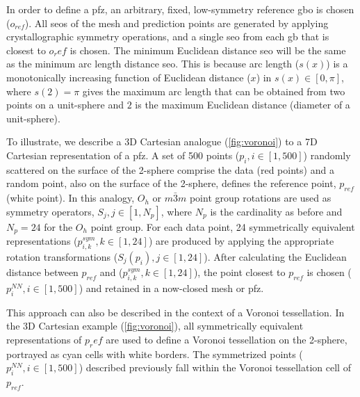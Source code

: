 \documentclass[preprint,12pt]{elsarticle}
\begin{document}
In order to define a \gls{pfz}, an arbitrary, fixed, low-symmetry reference \gls{gbo} is chosen ($o_{ref}$). All \glspl{seo} of the mesh and prediction points are generated by applying crystallographic symmetry operations, and a single \gls{seo} from each \gls{gb} that is closest to $o_ref$ is chosen. The minimum Euclidean distance \gls{seo} will be the same as the minimum arc length distance \gls{seo}. This is because arc length ($s(x)$) is a monotonically increasing function of Euclidean distance ($x$) in $s(x)\in[0,\pi]$, where $s(2)=\pi$ gives the maximum arc length that can be obtained from two points on a unit-sphere and $2$ is the maximum Euclidean distance (diameter of a unit-sphere).

To illustrate, we describe a 3D Cartesian analogue (\cref{fig:voronoi}) to a 7D Cartesian representation of a \gls{pfz}. A set of \num{500} points ($p_i, i\in[1,500]$) randomly scattered on the surface of the 2-sphere comprise the data (red points) and a random point, also on the surface of the 2-sphere, defines the reference point, $p_{ref}$ (white point). In this analogy, $O_h$ or $m\bar{3}m$ point group rotations are used as symmetry operators, $S_j,j\in[1,N_p]$, where $N_p$ is the cardinality as before and $N_p = 24$ for the $O_h$  point group. For each data point, \num{24} symmetrically equivalent representations ($p^{sym}_{i,k},k\in[1,24]$) are produced by applying the appropriate rotation transformations ($S_j(p_i),j\in[1,24]$). After calculating the Euclidean distance between $p_{ref}$ and ($p^{sym}_{i,k},k\in[1,24]$), the point closest to $p_{ref}$ is chosen ($p^{NN}_i,i\in[1,500]$) and retained in a now-closed mesh or \gls{pfz}.

This approach can also be described in the context of a Voronoi tessellation. In the 3D Cartesian example (\cref{fig:voronoi}), all symmetrically equivalent representations of $p_ref$ are used to define a Voronoi tessellation on the 2-sphere, portrayed as cyan cells with white borders. The symmetrized points ($p^{NN}_i,i\in[1,500]$) described previously fall within the Voronoi tessellation cell of $p_{ref}$.
\end{document}
